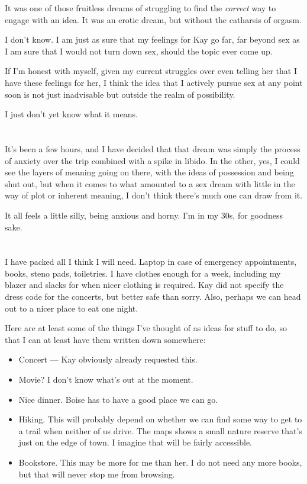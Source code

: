 It was one of those fruitless dreams of struggling to find the \emph{correct} way to engage with an idea. It was an erotic dream, but without the catharsis of orgasm.

I don't know. I am just as sure that my feelings for Kay go far, far beyond sex as I am sure that I would not turn down sex, should the topic ever come up.

If I'm honest with myself, given my current struggles over even telling her that I have these feelings for her, I think the idea that I actively pursue sex at any point soon is not just inadvisable but outside the realm of possibility.

I just don't yet know what it means.

\section{}

It's been a few hours, and I have decided that that dream was simply the process of anxiety over the trip combined with a spike in libido. In the other, yes, I could see the layers of meaning going on there, with the ideas of possession and being shut out, but when it comes to what amounted to a sex dream with little in the way of plot or inherent meaning, I don't think there's much one can draw from it.

It all feels a little silly, being anxious and horny. I'm in my 30s, for goodness sake.

\section{}

I have packed all I think I will need. Laptop in case of emergency appointments, books, steno pads, toiletries. I have clothes enough for a week, including my blazer and slacks for when nicer clothing is required. Kay did not specify the dress code for the concerts, but better safe than sorry. Also, perhaps we can head out to a nicer place to eat one night.

Here are at least some of the things I've thought of as ideas for stuff to do, so that I can at least have them written down somewhere:

\begin{itemize}
\tightlist
\item
  Concert --- Kay obviously already requested this.
\item
  Movie? I don't know what's out at the moment.
\item
  Nice dinner. Boise has to have a good place we can go.
\item
  Hiking. This will probably depend on whether we can find some way to get to a trail when neither of us drive. The maps shows a small nature reserve that's just on the edge of town. I imagine that will be fairly accessible.
\item
  Bookstore. This may be more for me than her. I do not need any more books, but that will never stop me from browsing.
\end{itemize}

